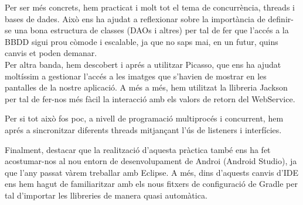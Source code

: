 \documentclass{article}
\begin{document}
Per ser més concrets, hem practicat i molt tot el tema de concurrència, threads i bases de dades. Això ens ha ajudat a reflexionar sobre la importància de definir-se una bona estructura de classes (DAOs i altres) per tal de fer que l'accés a la BBDD sigui prou còmode i escalable, ja que no saps mai, en un futur, quins canvis et poden demanar.\\

Per altra banda, hem descobert i aprés a utilitzar Picasso, que ens ha ajudat moltíssim a gestionar l'accés a les imatges que s'havien de mostrar en les pantalles de la nostre aplicació.  A més a més, hem utilitzat la llibreria Jackson per tal de fer-nos més fàcil la interacció amb els valors de retorn del WebService. 

Per si tot això fos poc, a nivell de programació multiprocés i concurrent, hem aprés a sincronitzar diferents threads mitjançant l'ús de listeners i interfícies.

Finalment, destacar que la realització d'aquesta pràctica també ens ha fet acostumar-nos al nou entorn de desenvolupament de Androi (Android Studio), ja que l'any passat vàrem treballar amb Eclipse. A més, dins d'aquests canvis d'IDE ens hem hagut de familiaritzar amb els nous fitxers de configuració de Gradle per tal d'importar les llibreries de manera quasi automàtica.
\end{document}
